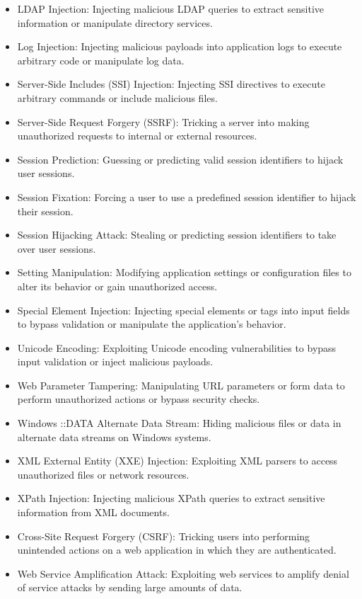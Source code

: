 \begin{itemize}
\item LDAP Injection: Injecting malicious LDAP queries to extract sensitive information or manipulate directory services.
\item Log Injection: Injecting malicious payloads into application logs to execute arbitrary code or manipulate log data.
\item Server-Side Includes (SSI) Injection: Injecting SSI directives to execute arbitrary commands or include malicious files.
\item Server-Side Request Forgery (SSRF): Tricking a server into making unauthorized requests to internal or external resources.
\item Session Prediction: Guessing or predicting valid session identifiers to hijack user sessions.
\item Session Fixation: Forcing a user to use a predefined session identifier to hijack their session.
\item Session Hijacking Attack: Stealing or predicting session identifiers to take over user sessions.
\item Setting Manipulation: Modifying application settings or configuration files to alter its behavior or gain unauthorized access.
\item Special Element Injection: Injecting special elements or tags into input fields to bypass validation or manipulate the application's behavior.
\item Unicode Encoding: Exploiting Unicode encoding vulnerabilities to bypass input validation or inject malicious payloads.
\item Web Parameter Tampering: Manipulating URL parameters or form data to perform unauthorized actions or bypass security checks.
\item Windows ::DATA Alternate Data Stream: Hiding malicious files or data in alternate data streams on Windows systems.
\item XML External Entity (XXE) Injection: Exploiting XML parsers to access unauthorized files or network resources.
\item XPath Injection: Injecting malicious XPath queries to extract sensitive information from XML documents.
\item Cross-Site Request Forgery (CSRF): Tricking users into performing unintended actions on a web application in which they are authenticated.
\item Web Service Amplification Attack: Exploiting web services to amplify denial of service attacks by sending large amounts of data.
\end{itemize}


